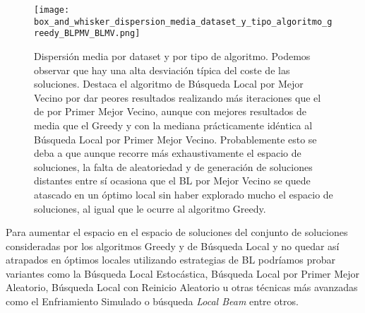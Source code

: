 \begin{figure}[ht]
    \centering
    \texttt{[image: box\_and\_whisker\_dispersion\_media\_dataset\_y\_tipo\_algoritmo\_greedy\_BLPMV\_BLMV.png]}
    \caption{Dispersión media por dataset y por tipo de algoritmo. Podemos observar que hay una alta desviación típica del coste de las soluciones.
    Destaca el algoritmo de Búsqueda Local por Mejor Vecino por dar peores resultados realizando más iteraciones que el de por Primer
    Mejor Vecino, aunque con mejores resultados de media que el Greedy y con la mediana prácticamente idéntica al Búsqueda Local por Primer Mejor Vecino.
    Probablemente esto se deba a que aunque recorre más exhaustivamente el espacio de soluciones, la falta de aleatoriedad y de generación
    de soluciones distantes entre sí ocasiona que el BL por Mejor Vecino se quede atascado en un óptimo local sin haber explorado mucho el espacio
    de soluciones, al igual que le ocurre al algoritmo Greedy.}
\end{figure}

Para aumentar el espacio en el espacio de soluciones del conjunto de soluciones consideradas por los algoritmos Greedy y de Búsqueda Local y no quedar
así atrapados en óptimos locales utilizando estrategias de BL podríamos probar variantes como la Búsqueda Local Estocástica, Búsqueda Local por Primer Mejor Aleatorio, Búsqueda Local
con Reinicio Aleatorio u otras técnicas más avanzadas como el Enfriamiento Simulado o búsqueda \textit{Local Beam} entre otros.\cite[Sección 4.1]{russell2020artificial}


